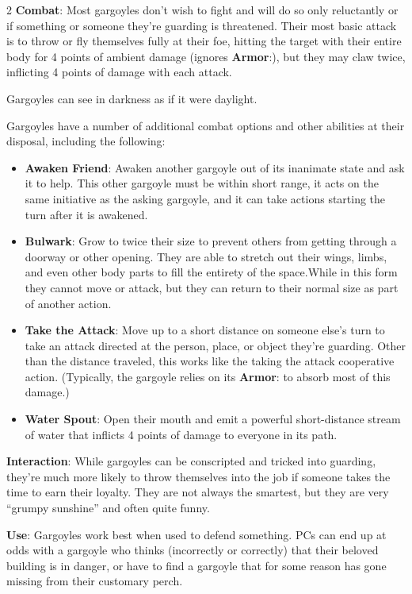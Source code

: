 \begin{multicols}{2}
\textbf{Combat}: Most gargoyles don’t wish to fight and will do so only reluctantly or if something or someone they’re guarding is threatened. Their most basic attack is to throw or fly themselves fully at their foe, hitting the target with their entire body for 4 points of ambient damage (ignores \textbf{Armor}:), but they may claw twice, inflicting 4 points of damage with each attack. 

Gargoyles can see in darkness as if it were daylight. 

Gargoyles have a number of additional combat options and other abilities at their disposal, including the following: 
\begin{itemize}
\item \textbf{Awaken Friend}: Awaken another gargoyle out of its inanimate state and ask it to help. This other gargoyle must be within short range, it acts on the same initiative as the asking gargoyle, and it can take actions starting the turn after it is awakened. 
\item \textbf{Bulwark}: Grow to twice their size to prevent others from getting through a doorway or other opening. They are able to stretch out their wings, limbs, and even other body parts to fill the entirety of the space.While in this form they cannot move or attack, but they can return to their normal size as part of another action. 
\item \textbf{Take the Attack}: Move up to a short distance on someone else’s turn to take an attack directed at the person, place, or object they’re guarding. Other than the distance traveled, this works like the taking the attack cooperative action. (Typically, the gargoyle relies on its \textbf{Armor}: to absorb most of this damage.) 
\item \textbf{Water Spout}: Open their mouth and emit a powerful short-distance stream of water that inflicts 4 points of damage to everyone in its path. 
\end{itemize}

\textbf{Interaction}: While gargoyles can be conscripted and tricked into guarding, they’re much more likely to throw themselves into the job if someone takes the time to earn their loyalty. They are not always the smartest, but they are very “grumpy sunshine” and often quite funny. 

\textbf{Use}: Gargoyles work best when used to defend something. PCs can end up at odds with a gargoyle who thinks (incorrectly or correctly) that their beloved building is in danger, or have to find a gargoyle that for some reason has gone missing from their customary perch.


\end{multicols}
